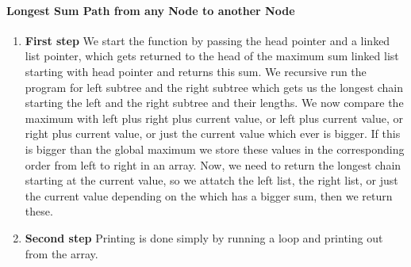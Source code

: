 \documentclass[a4paper,11pt]{article}
\begin{document}
\paragraph{Longest Sum Path from any Node to another Node}
\begin{enumerate}
	\item \textbf{First step}\newline
	We start the function by passing the head pointer and a linked list pointer, which gets returned to the head of the maximum sum linked list starting with head pointer and returns this sum.\newline
	We recursive run the program for left subtree and the right subtree which gets us the longest chain starting the left and the right subtree and their lengths. We now compare the maximum with left plus right plus current value, or left plus current value, or right plus current value, or just the current value which ever is bigger. If this is bigger than the global maximum we store these values in the corresponding order from left to right in an array.\newline
	Now, we need to return the longest chain starting at the current value, so we attatch the left list, the right list, or just the current value depending on the which has a bigger sum, then we return these.
	\item \textbf{Second step}\newline
	Printing is done simply by running a loop and printing out from the array.\newline
\end{enumerate}
\end{document}
